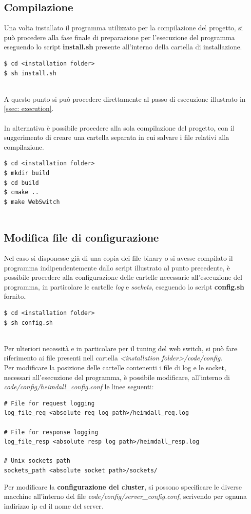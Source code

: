 \documentclass[italian]{tktltiki2}
\begin{document}
\subsection{Compilazione}
Una volta installato il programma utilizzato per la compilazione del progetto, si può procedere alla fase finale di preparazione per l'esecuzione del programma eseguendo lo script \textbf{install.sh} presente all'interno della cartella di installazione.
\begin{lstlisting}
$ cd <installation folder>
$ sh install.sh 
	
\end{lstlisting}
A questo punto si può procedere direttamente al passo di esecuzione illustrato in \ref{ssec: execution}. \\\\
In alternativa è possibile procedere alla sola compilazione del progetto, con il suggerimento di creare una cartella separata in cui salvare i file relativi alla compilazione.
\begin{lstlisting}
$ cd <installation folder>
$ mkdir build
$ cd build
$ cmake ..
$ make WebSwitch
	
\end{lstlisting}
\subsection{Modifica file di configurazione} \label{ssec: configuration}
Nel caso si disponesse già di una copia dei file binary o si avesse compilato il programma indipendentemente dallo script illustrato al punto precedente, è possibile procedere alla configurazione delle cartelle necessarie all'esecuzione del programma, in particolare le cartelle \emph{log} e \emph{sockets}, eseguendo lo script \textbf{config.sh} fornito.
\begin{lstlisting}
$ cd <installation folder>
$ sh config.sh 
	
\end{lstlisting}
Per ulteriori necessità e in particolare per il tuning del web switch, si può fare riferimento ai file presenti nell cartella \emph{<installation folder>/code/config}. \\
Per modificare la posizione delle cartelle contenenti i file di log e le socket, necessari all'esecuzione del programma, è possibile modificare, all'interno di \emph{code/config/heimdall\_config.conf} le linee seguenti:
\begin{lstlisting}
# File for request logging
log_file_req <absolute req log path>/heimdall_req.log

# File for response logging
log_file_resp <absolute resp log path>/heimdall_resp.log

# Unix sockets path
sockets_path <absolute socket path>/sockets/	

\end{lstlisting}
Per modificare la \textbf{configurazione del cluster}, si possono specificare le diverse macchine all'interno del file \emph{code/config/server\_config.conf}, scrivendo per ognuna indirizzo ip ed il nome del server.\\
\end{document}
